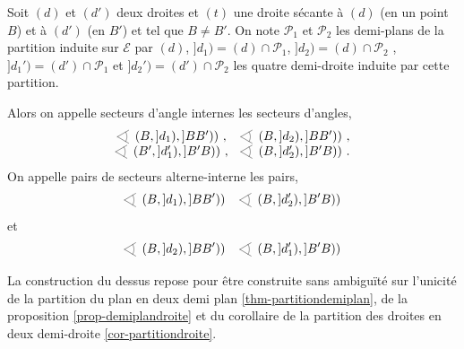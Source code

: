 \begin{defi}
Soit $(d)$ et $(d')$ deux droites et $(t)$ une droite sécante à $(d)$ (en un point $B$) et à $(d')$ (en $B'$) et tel que $B\neq B'$. On note $\mathcal{P}_1$ et $\mathcal{P}_2$ les demi-plans de la partition induite sur $\mathcal{E}$ par $(d)$, $]d_1) = (d)\cap\mathcal{P}_1$, $]d_2) = (d)\cap\mathcal{P}_2$ , $]d_1') = (d')\cap\mathcal{P}_1$ et $]d_2') = (d')\cap\mathcal{P}_2$ les quatre demi-droite induite par cette partition. 

Alors on appelle secteurs d'angle internes les secteurs d'angles,
\begin{equation*}
    \begin{array}{cc}
         \anglesaillant\left(B,]d_1),]BB')\right)\,,& \anglesaillant\left(B,]d_2),]BB')\right) \,, \\
         \anglesaillant\left(B',]d_1'),]B'B)\right)\,,& \anglesaillant\left(B,]d_2'),]B'B)\right) \,.
    \end{array}
\end{equation*}
On appelle pairs de secteurs alterne-interne les pairs,
\begin{equation*}
    \anglesaillant\left(B,]d_1),]BB')\right) \quad \anglesaillant\left(B,]d_2'),]B'B)\right)
\end{equation*}
et
\begin{equation*}
    \anglesaillant\left(B,]d_2),]BB')\right) \quad \anglesaillant\left(B,]d_1'),]B'B)\right)
\end{equation*}
\end{defi}
\begin{rema}
    La construction du dessus repose pour être construite sans ambiguïté sur l'unicité de la partition du plan en deux demi plan \ref{thm-partitiondemiplan}, de la proposition \ref{prop-demiplandroite} et du corollaire de la partition des droites en deux demi-droite \ref{cor-partitiondroite}.
\end{rema}
